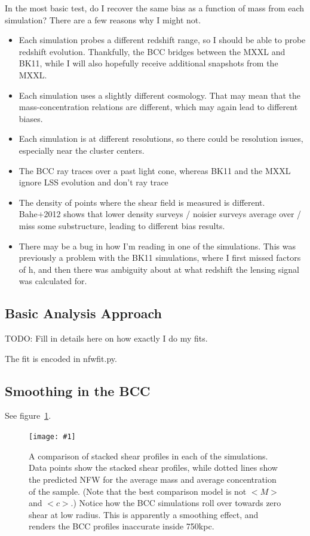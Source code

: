 \documentclass[11pt]{article}
\newcommand{\logfig}[2]{
See figure~\ref{fig:#1}.
\begin{figure}[!ht] 
\texttt{[image: \#1]} 
\caption{#2} 
\label{fig:#1} 
\end{figure}
}
\begin{document}
In the most basic test, do I recover the same bias as a function of mass from each simulation? There are a few reasons why I might not. 

\begin{itemize}
\item Each simulation probes a different redshift range, so I should be able to probe redshift evolution. Thankfully, the BCC bridges between the MXXL and BK11, while I will also hopefully receive additional snapshots from the MXXL. 
\item Each simulation uses a slightly different cosmology. That may mean that the mass-concentration relations are different, which may again lead to different biases. 
\item Each simulation is at different resolutions, so there could be resolution issues, especially near the cluster centers. 
\item The BCC ray traces over a past light cone, whereas BK11 and the MXXL ignore LSS evolution and don't ray trace
\item The density of points where the shear field is measured is different. Bahe+2012 shows that lower density surveys / noisier surveys average over / miss some substructure, leading to different bias results.
\item There may be a bug in how I'm reading in one of the simulations. This was previously a problem with the BK11 simulations, where I first missed factors of h, and then there was ambiguity about at what redshift the lensing signal was calculated for.
\end{itemize}

\subsection{Basic Analysis Approach}

TODO: Fill in details here on how exactly I do my fits.

The fit is encoded in nfwfit.py. 


\subsection{Smoothing in the BCC}
\label{sec:bcc_smoothing}

\logfig{figures/shearprofilecomp.png}{A comparison of stacked shear profiles in each of the simulations. Data points show the stacked shear profiles, while dotted lines show the predicted NFW for the average mass and average concentration of the sample. (Note that the best comparison model is not $<M>$ and $<c>$.) Notice how the BCC simulations roll over towards zero shear at low radius. This is apparently a smoothing effect, and renders the BCC profiles inaccurate inside 750kpc.}
\end{document}
